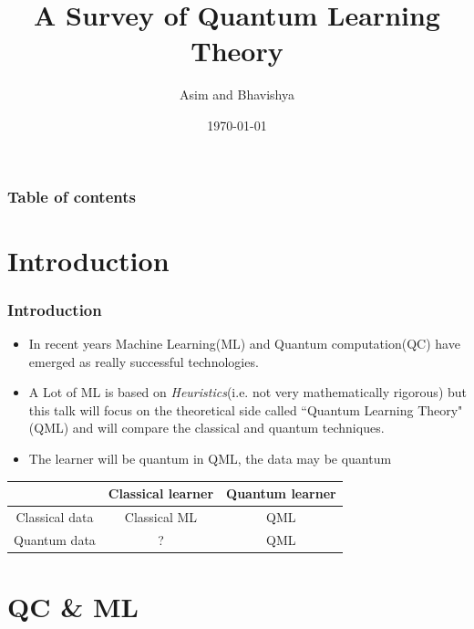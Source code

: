\documentclass{beamer}
\begin{document}
\title{A Survey of Quantum Learning Theory}
\author{Asim and Bhavishya}
\date{\today} 

\begin{frame}
\titlepage
\end{frame}

\begin{frame}\frametitle{Table of contents}\tableofcontents

\end{frame} 


\section{Introduction} 
\begin{frame}\frametitle{Introduction} 
\begin{itemize}
    \item  In recent years Machine Learning(ML) and Quantum computation(QC) have emerged as really successful technologies.  
    \item  A Lot of ML is based on \textit{Heuristics}(i.e. not very mathematically rigorous) but this talk will focus on the theoretical side
    called ``Quantum Learning Theory"(QML) and will compare the classical and quantum techniques. 
    \item  The learner will be quantum in QML, the data may be quantum
    \end{itemize}
    \begin{center}
\begin{tabular}{ |c|c|c| } 
 \hline
  &  Classical learner &  Quantum learner\\ 
  \hline
  Classical data & Classical ML & QML \\ 
  \hline
  Quantum data & ? &  QML \\ 
 \hline
\end{tabular}
\end{center}
 \end{frame}

\section{QC \& ML}
\end{document}
